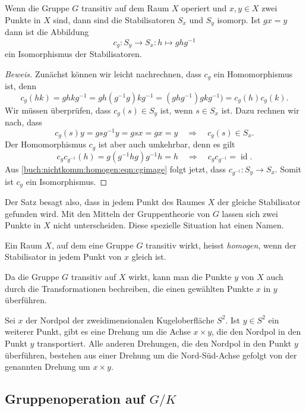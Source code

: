 \begin{satz}
Wenn die Gruppe $G$ transitiv auf dem Raum $X$ operiert und $x,y\in X$
zwei Punkte in $X$ sind, dann sind die Stabilisatoren $S_x$ und $S_y$
isomorp.
Ist $gx=y$ dann ist die Abbildung
\[
c_g\colon
S_y\to S_x: h\mapsto ghg^{-1}
\]
ein Isomorphismus der Stabilisatoren.
\end{satz}

\begin{proof}[Beweis]
Zunächst können wir leicht nachrechnen, dass $c_g$ ein Homomorphismus ist,
denn
\[
c_g(hk)
=
ghkg^{-1}
=
gh(g^{-1}g)kg^{-1}
=
(ghg^{-1})gkg^{-1})
=
c_g(h)c_g(k).
\]
Wir müssen überprüfen, dass $c_g(s)\in S_y$ ist, wenn $s\in S_x$ ist.
Dazu rechnen wir nach, dass
\begin{equation}
c_g(s)y = gsg^{-1} y = gsx=gx=y
\quad\Rightarrow\quad
c_g(s)\in S_x.
\label{buch:nichtkomm:homogen:eqn:cgimage}
\end{equation}
Der Homomorphismus $c_g$ ist aber auch umkehrbar, denn es gilt
\[
c_gc_{g^{-1}}(h)
=
g(g^{-1}hg)g^{-1}h
=
h
\quad\Rightarrow\quad
c_gc_{g^{-1}}=\operatorname{id}.
\]
Aus \eqref{buch:nichtkomm:homogen:eqn:cgimage} folgt jetzt, dass
$c_{g^{-1}}\colon S_y\to S_x$.
Somit ist $c_g$ ein Isomorphismus.
\end{proof}

Der Satz besagt also, dass in jedem Punkt des Raumes $X$ der gleiche
Stabilisator gefunden wird.
Mit den  Mitteln der Gruppentheorie von $G$ lassen sich zwei Punkte 
in $X$ nicht unterscheiden.
Diese spezielle Situation hat einen Namen.

\begin{definition}
Ein Raum $X$, auf dem eine Gruppe $G$ transitiv wirkt, heisst
{\em homogen}, wenn der Stabilisator in jedem Punkt von $x$ gleich ist.
%
\end{definition}

Da die Gruppe $G$ transitiv auf $X$ wirkt, kann man die Punkte $y$ von 
$X$ auch durch die Transformationen bechreiben, die einen gewählten
Punkte $x$ in $y$ überführen.

\begin{beispiel}
Sei $x$ der Nordpol der zweidimensionalen Kugeloberfläche $S^2$.
Ist $y\in S^2$ ein weiterer Punkt, gibt es eine Drehung um die Achse
$x\times y$, die den Nordpol in den Punkt $y$ transportiert.
Alle anderen Drehungen, die den Nordpol in den Punkt $y$ überführen,
bestehen aus einer Drehung um die Nord-Süd-Achse gefolgt von der
genannten Drehung um $x\times y$.
\end{beispiel}

%
%
\subsection{Gruppenoperation auf $G/K$
\label{buch:nichtkomm:homogen:subsection:opaufgk}}



